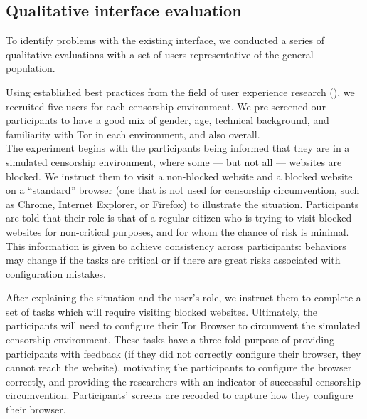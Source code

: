 \documentclass{template}
\begin{document}
\subsection{Qualitative interface evaluation}
To identify problems with the existing interface, we conducted a series of
qualitative evaluations with a set of users representative of the general
population.

Using established best practices from the field of user experience research
(\cite{howmanyusers}), we recruited five users for each censorship environment.
We pre-screened our participants to have a good mix of gender, age, technical
background, and familiarity with Tor in each environment, and also overall. \\


The experiment begins with the participants being informed that they are in a
simulated censorship
environment, where some --- but not all --- websites are blocked. We
instruct them to visit a non-blocked website and a blocked website on a
``standard'' browser (one that is not used for censorship circumvention, such
as Chrome, Internet Explorer, or Firefox) to illustrate the situation.
Participants are told that their
role is that of a regular citizen who is trying to visit blocked websites
for non-critical purposes,
and for whom the chance of risk is minimal. This information is given
to achieve
consistency across participants: behaviors may change if the tasks are
critical or if there are great risks associated with configuration mistakes.

After explaining the situation and the user's role, we
instruct them to complete a set of
tasks which will require visiting blocked websites. Ultimately, the
participants will need to configure their Tor Browser to circumvent the
simulated censorship environment. These tasks have a three-fold purpose of
providing participants with feedback (if they did not correctly configure their
browser, they cannot reach the website), motivating the participants to
configure the browser correctly, and providing the researchers with an
indicator of successful censorship circumvention.
Participants' screens are recorded to capture how they configure
their browser.
\end{document}
